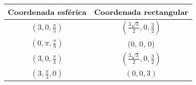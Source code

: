 \renewcommand{\arraystretch}{2}

\begin{center}
  \begin{tabular}{| c | c |}
    \hline
    Coordenada esférica & Coordenada rectangular \\ \hline
    $\left( 3, 0, \frac{\pi}{3} \right)$ & $\left( \frac{3 \sqrt{3} }{2}, 0 , \frac{3}{2} \right)$ \\ \hline
    $\left( 0, \pi, \frac{\pi}{5}  \right)$ & (0, 0, 0) \\ \hline
    $\left( 3, 0, \frac{\pi}{3} \right)$ & $\left( \frac{3\sqrt{3}}{2}, 0, \frac{3}{2} \right)$ \\ \hline
    $\left( 3, \frac{\pi}{3}, 0 \right)$ & $\left( 0, 0, 3 \right)$ \\ \hline
  \end{tabular}
\end{center}
